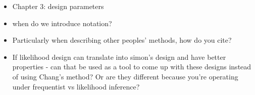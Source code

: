 \documentclass[12pt]{report}\usepackage[]{graphicx}\usepackage[]{color}
\newlength{\li}\setlength{\li}{14.48pt}
\newlength{\di}\setlength{\di}{-3.5mm}
\begin{document}

\begin{itemize}
  \item Chapter 3: design parameters
  \item when do we introduce notation?
  \item Particularly when describing other peoples' methods, how do you cite?
  \item If likelihood design can translate into simon's design and have better properties - can that be used as a tool to come up with these designs instead of using Chang's method? Or are they different because you're operating under frequentist vs likelihood inference? 
\end{itemize}





\cite{Koyama}
%

		
\end{document}
